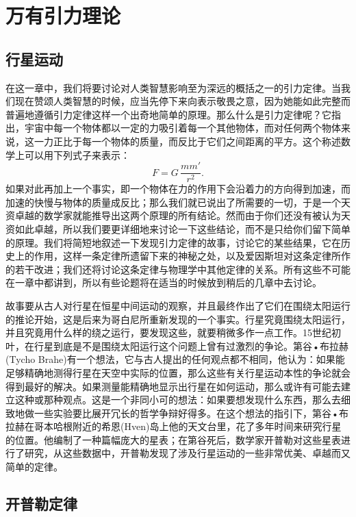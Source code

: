 \chapter{万有引力理论}

\section{行星运动}

在这一章中，我们将要讨论对人类智慧影响至为深远的概括之一的引力定律。当我们现在赞颂人类智慧的时候，应当先停下来向表示敬畏之意，因为她能如此完整而普遍地遵循引力定律这样一个出奇地简单的原理。那么什么是引力定律呢？它指出，宇宙中每一个物体都以一定的力吸引着每一个其他物体，而对任何两个物体来说，这一力正比于每一个物体的质量，而反比于它们之间距离的平方。这个称述数学上可以用下列式子来表示：
\begin{equation*}
F=G\,\frac{mm'}{r^2}.
\end{equation*}
如果对此再加上一个事实，即一个物体在力的作用下会沿着力的方向得到加速，而加速的快慢与物体的质量成反比；那么我们就已说出了所需要的一切，于是一个天资卓越的数学家就能推导出这两个原理的所有结论。然而由于你们还没有被认为天资如此卓越，所以我们要更详细地来讨论一下这些结论，而不是只给你们留下简单的原理。我们将简短地叙述一下发现引力定律的故事，讨论它的某些结果，它在历史上的作用，这样一条定律所遗留下来的神秘之处，以及爱因斯坦对这条定律所作的若干改进；我们还将讨论这条定律与物理学中其他定律的关系。所有这些不可能在一章中都讲到，所以有些论题将在适当的时候放到稍后的几章中去讨论。

故事要从古人对行星在恒星中间运动的观察，并且最终作出了它们在围绕太阳运行的推论开始，这是后来为哥白尼所重新发现的一个事实。行星究竟围绕太阳运行，并且究竟用什么样的绕之运行，要发现这些，就要稍微多作一点工作。15世纪初叶，在行星到底是不是围绕太阳运行这个问题上曾有过激烈的争论。第谷•布拉赫(Tycho Brahe)有一个想法，它与古人提出的任何观点都不相同，他认为：如果能足够精确地测得行星在天空中实际的位置，那么这些有关行星运动本性的争论就会得到最好的解决。如果测量能精确地显示出行星在如何运动，那么或许有可能去建立这种或那种观点。这是一个非同小可的想法：如果要想发现什么东西，那么去细致地做一些实验要比展开冗长的哲学争辩好得多。在这个想法的指引下，第谷•布拉赫在哥本哈根附近的希恩(Hven)岛上他的天文台里，花了多年时间来研究行星的位置。他编制了一种篇幅庞大的星表；在第谷死后，数学家开普勒对这些星表进行了研究，从这些数据中，开普勒发现了涉及行星运动的一些非常优美、卓越而又简单的定律。



\section{开普勒定律}

